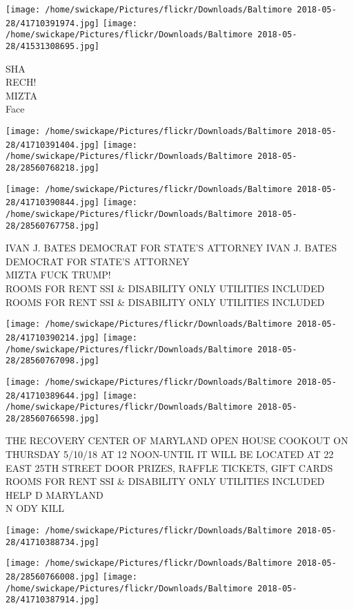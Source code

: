 \documentclass[10pt,letterpaper]{article}
\begin{document}
\texttt{[image: /home/swickape/Pictures/flickr/Downloads/Baltimore 2018-05-28/41710391974.jpg]}
\texttt{[image: /home/swickape/Pictures/flickr/Downloads/Baltimore 2018-05-28/41531308695.jpg]}

SHA\\
RECH!\\
MIZTA\\
Face
\pagebreak

\texttt{[image: /home/swickape/Pictures/flickr/Downloads/Baltimore 2018-05-28/41710391404.jpg]}
\texttt{[image: /home/swickape/Pictures/flickr/Downloads/Baltimore 2018-05-28/28560768218.jpg]}

\texttt{[image: /home/swickape/Pictures/flickr/Downloads/Baltimore 2018-05-28/41710390844.jpg]}
\texttt{[image: /home/swickape/Pictures/flickr/Downloads/Baltimore 2018-05-28/28560767758.jpg]}

IVAN J. BATES DEMOCRAT FOR STATE'S ATTORNEY IVAN J. BATES DEMOCRAT FOR STATE'S ATTORNEY\\
MIZTA FUCK TRUMP!\\
ROOMS FOR RENT SSI \& DISABILITY ONLY UTILITIES INCLUDED\\
ROOMS FOR RENT SSI \& DISABILITY ONLY UTILITIES INCLUDED
\pagebreak

\texttt{[image: /home/swickape/Pictures/flickr/Downloads/Baltimore 2018-05-28/41710390214.jpg]}
\texttt{[image: /home/swickape/Pictures/flickr/Downloads/Baltimore 2018-05-28/28560767098.jpg]}

\texttt{[image: /home/swickape/Pictures/flickr/Downloads/Baltimore 2018-05-28/41710389644.jpg]}
\texttt{[image: /home/swickape/Pictures/flickr/Downloads/Baltimore 2018-05-28/28560766598.jpg]}

THE RECOVERY CENTER OF MARYLAND OPEN HOUSE COOKOUT ON THURSDAY 5/10/18 AT 12 NOON{-}UNTIL IT WILL BE LOCATED AT 22 EAST 25TH STREET DOOR PRIZES, RAFFLE TICKETS, GIFT CARDS\\
ROOMS FOR RENT SSI \& DISABILITY ONLY UTILITIES INCLUDED\\
HELP D MARYLAND\\
N ODY KILL
\pagebreak

\texttt{[image: /home/swickape/Pictures/flickr/Downloads/Baltimore 2018-05-28/41710388734.jpg]}

\vspace{0.25in}
\texttt{[image: /home/swickape/Pictures/flickr/Downloads/Baltimore 2018-05-28/28560766008.jpg]}
\texttt{[image: /home/swickape/Pictures/flickr/Downloads/Baltimore 2018-05-28/41710387914.jpg]}
\end{document}
